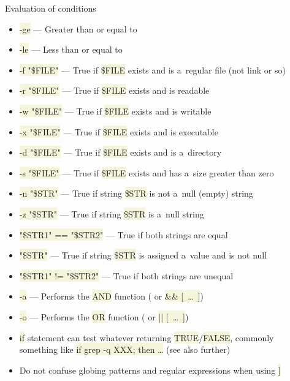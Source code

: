 \documentclass[compress, ucs, xelatex, 11pt, xcolor=svgnames, aspectratio=169,
	hyperref={
		bookmarks=true,
		unicode=true,
		colorlinks=true,
		pdftitle={Linux, command line and MetaCentrum},
		plainpages=false,
		pdfauthor={Vojtech Zeisek},
		pdfsubject={Course about use of Linux command line, writing shell scripts and using MetaCentrum of CESNET},
		pdfcreator={XeLaTeX},
		pdfkeywords={Linux, GNU, BASH, shell, command line, MetaCentrum},
		linkcolor=DarkRed, %
		anchorcolor=DarkBlue, %
		citecolor=Indigo, %
		filecolor=NavyBlue, %
		menucolor=DarkMagenta, %
		urlcolor=DarkBlue, %
		pdftex},
	url={hyphens, lowtilde} %
	]{beamer}
\renewcommand{\texttt}[1]{\colorbox{Beige}{{\ttfamily #1}}}
\begin{document}
\begin{frame}[allowframebreaks]{Evaluation of conditions}
\begin{itemize}
		\item \texttt{-ge} --- Greater than or equal to
		\item \texttt{-le} --- Less than or equal to
		\item \texttt{-f "\$\textbraceleft FILE\textbraceright "} --- True if \texttt{\$FILE} exists and is a~regular file (not link or so)
		\item \texttt{-r "\$\textbraceleft FILE\textbraceright "} --- True if \texttt{\$FILE} exists and is readable
		\item \texttt{-w "\$\textbraceleft FILE\textbraceright "} --- True if \texttt{\$FILE} exists and is writable
		\item \texttt{-x "\$\textbraceleft FILE\textbraceright "} --- True if \texttt{\$FILE} exists and is executable
		\item \texttt{-d "\$\textbraceleft FILE\textbraceright "} --- True if \texttt{\$FILE} exists and is a~directory
		\item \texttt{-s "\$\textbraceleft FILE\textbraceright "} --- True if \texttt{\$FILE} exists and has a~size greater than zero
		\item \texttt{-n "\$\textbraceleft STR\textbraceright "} --- True if string \texttt{\$STR} is not a~null (empty) string
		\item \texttt{-z "\$\textbraceleft STR\textbraceright "} --- True if string \texttt{\$STR} is a~null string
		\item \texttt{"\$\textbraceleft STR1\textbraceright " == "\$\textbraceleft STR2\textbraceright "} --- True if both strings are equal
		\item \texttt{"\$\textbraceleft STR\textbraceright "} --- True if string \texttt{\$STR} is assigned a~value and is not null
		\item \texttt{"\$\textbraceleft STR1\textbraceright " != "\$\textbraceleft STR2\textbraceright "} --- True if both strings are unequal
		\item \texttt{-a} --- Performs the \texttt{AND} function (\texttt{[~\ldots~-a~\ldots~]} or \texttt{[~\ldots~] \&\& [~\ldots~]})
		\item \texttt{-o} --- Performs the \texttt{OR} function (\texttt{[~\ldots~-o~\ldots~]} or \texttt{[~\ldots~] || [~\ldots~]})
		\item \texttt{if} statement can test whatever returning \texttt{TRUE}/\texttt{FALSE}, commonly something like \texttt{if grep -q XXX; then \ldots} (see also further)
		\item Do not confuse globing patterns and regular expressions when using \texttt{[[~\ldots~]]}

\end{itemize}
\end{frame}
\end{document}

